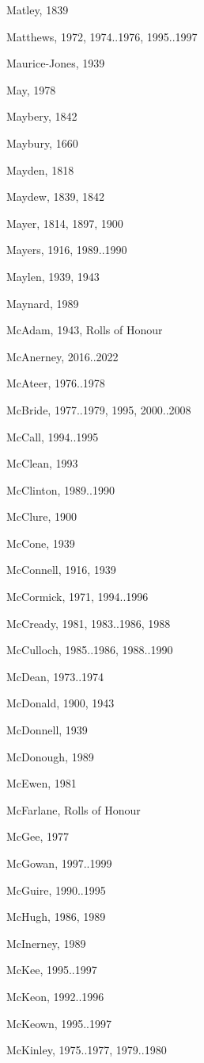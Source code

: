 \begin{theindex}
\item Matley, 1839
\item Matthews, 1972, 1974..1976, 1995..1997
\item Maurice-Jones, 1939
\item May, 1978
\item Maybery, 1842
\item Maybury, 1660
\item Mayden, 1818
\item Maydew, 1839, 1842
\item Mayer, 1814, 1897, 1900
\item Mayers, 1916, 1989..1990
\item Maylen, 1939, 1943
\item Maynard, 1989
\item McAdam, 1943, Rolls of Honour
\item McAnerney, 2016..2022
\item McAteer, 1976..1978
\item McBride, 1977..1979, 1995, 2000..2008
\item McCall, 1994..1995
\item McClean, 1993
\item McClinton, 1989..1990
\item McClure, 1900
\item McCone, 1939
\item McConnell, 1916, 1939
\item McCormick, 1971, 1994..1996
\item McCready, 1981, 1983..1986, 1988
\item McCulloch, 1985..1986, 1988..1990
\item McDean, 1973..1974
\item McDonald, 1900, 1943
\item McDonnell, 1939
\item McDonough, 1989
\item McEwen, 1981
\item McFarlane, Rolls of Honour
\item McGee, 1977
\item McGowan, 1997..1999
\item McGuire, 1990..1995
\item McHugh, 1986, 1989
\item McInerney, 1989
\item McKee, 1995..1997
\item McKeon, 1992..1996
\item McKeown, 1995..1997
\item McKinley, 1975..1977, 1979..1980

\end{theindex}
